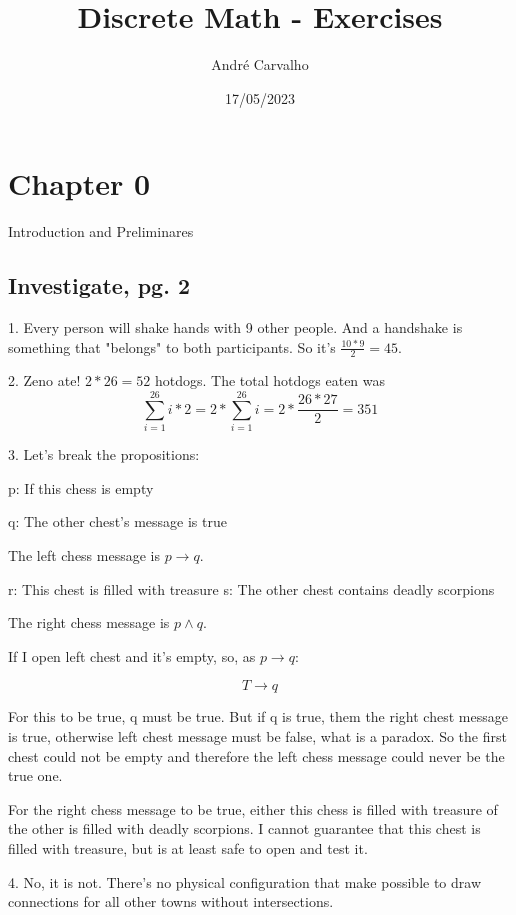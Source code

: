 \documentclass{article}
\begin{document}
	
	\title{Discrete Math - Exercises}
	\author{André Carvalho}
	\date{17/05/2023} %
	
	\maketitle
	
	\setcounter{section}{-1}
	
	\section{Chapter 0}
	Introduction and Preliminares
	
	\subsection{Investigate, pg. 2}
	1. Every person will shake hands with 9 other people. And a handshake is something that "belongs" to both participants. So it's $\frac{10 * 9}{2} = 45$.
	  
	2. Zeno ate! $2 * 26 = 52$ hotdogs. The total hotdogs eaten was 
	$$
	\sum_{i=1}^{26} i*2 = 2 * \sum_{i=1}^{26} i = 2 * \frac{26 * 27}{2} = 351
	$$

	3. Let's break the propositions:

	p: If this chess is empty

	q: The other chest's message is true

	The left chess message is $p \rightarrow q$.

	r: This chest is filled with treasure
	s: The other chest contains deadly scorpions

	The right chess message is $p \wedge q$.

	If I open left chest and it's empty, so, as $p \rightarrow q$:

	$$T \rightarrow q$$

	For this to be true, q must be true. But if q is true, them the right chest message is true, otherwise left chest message must be false, what is a paradox. So the first chest could not be empty and therefore the left chess message could never be the true one.

	For the right chess message to be true, either this chess is filled with treasure of the other is filled with deadly scorpions. I cannot guarantee that this chest is filled with treasure, but is at least safe to open and test it.
	
	4. No, it is not. There's no physical configuration that make possible to draw connections for all other towns without intersections.
\end{document}

